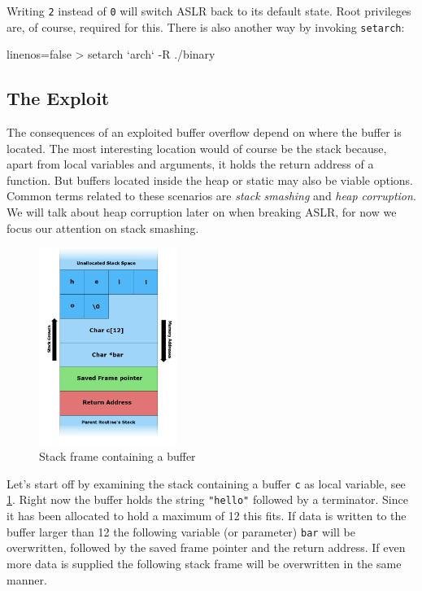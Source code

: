 \documentclass[article]{uibk}
\begin{document}
Writing \texttt{2} instead of \texttt{0} will switch ASLR back to its default
state. Root privileges are, of course, required for this. There is also another
way by invoking \texttt{setarch}:

\begin{code*}{linenos=false}
    > setarch `arch` -R ./binary
\end{code*}

\subsection{The Exploit}

The consequences of an exploited buffer overflow depend on where the buffer is
located. The most interesting location would of course be the stack because,
apart from local variables and arguments, it holds the return address of a
function. But buffers located inside the heap or static may also be viable
options. Common terms related to these scenarios are \textit{stack smashing}
and \textit{heap corruption}. We will talk about heap corruption later on when
breaking ASLR, for now we focus our attention on stack smashing.

\begin{figure}[H]
    \centering
    \includegraphics[width=0.4\textwidth]{gfx/stack_smash.png}
    \caption{Stack frame containing a buffer}
    \label{fig:stack_frame}
\end{figure}

Let's start off by examining the stack containing a buffer \texttt{c} as local
variable, see \cref{fig:stack_frame}. Right now the buffer holds the string
\texttt{"hello"} followed by a terminator. Since it has been allocated
to hold a maximum of \SI{12}{\byte} this fits. If data is written to the buffer
larger than \SI{12}{\byte} the following variable (or parameter) \texttt{bar}
will be overwritten, followed by the saved frame pointer and the return
address. If even more data is supplied the following stack frame will be
overwritten in the same manner.
\end{document}
